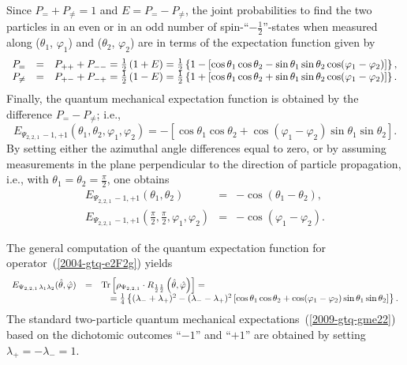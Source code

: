 \documentclass[pra,amsfonts,showpacs,showkeys,preprint]{revtex4}
\begin{document}
Since $P_= + P_{\neq} = 1$ and $E= P_= - P_{\neq}$, the joint probabilities to find the two particles
in an even or in an odd number of
spin-``$-\frac{1}{2}$''-states when measured along
($\theta_1$, $\varphi_1 $) and
($\theta_2$, $\varphi_2 $)
are in terms of the expectation function given by
\begin{equation}
\begin{array}{rcl}
P_= &=& P_{++}+P_{--} =
{1\over2}\left(1 + E  \right)
=\frac{1}{2} \left\{ 1- \left[\cos \theta_1 \cos \theta_2 - \sin \theta_1 \sin \theta_2 \cos (\varphi_1-\varphi_2) \right]\right\}
,
\\
P_{\neq} &=& P_{+-}+P_{-+} =
{1\over2}\left(1 - E \right)
=\frac{1}{2} \left\{ 1+ \left[\cos \theta_1 \cos \theta_2 + \sin \theta_1 \sin \theta_2 \cos (\varphi_1-\varphi_2) \right]\right\}
.
\end{array}
\end{equation}
Finally, the quantum mechanical expectation function is obtained by  the difference $P_= -P_{\neq }$; i.e.,
\begin{equation}
E_{{ \Psi_{2,2,1}}\,-1,+1  }(\theta_1,\theta_2,\varphi_1 , \varphi_2)=
-\left[\cos \theta_1 \cos \theta_2 + \cos (\varphi_1 - \varphi_2) \sin \theta_1 \sin \theta_2\right]
.
\label{2009-gtq-gme22}
\end{equation}
By setting either the azimuthal angle differences equal to zero,
or by assuming measurements in the plane perpendicular to the direction of particle propagation,
i.e., with $\theta_1=\theta_2 =\frac{\pi}{2}$,
one obtains
\begin{equation}
\label{2009-gtq-edosgc}
\begin{array}{rcl}
E_{{ \Psi_{2,2,1}}\,-1,+1  }(\theta_1,\theta_2)&=& -\cos (\theta_1 - \theta_2),\\
E_{{ \Psi_{2,2,1}}\,-1,+1  }(\frac{\pi}{2},\frac{\pi}{2},\varphi_1 , \varphi_2) &=& - \cos (\varphi_1 - \varphi_2).
\end{array}
\end{equation}


The general computation of the quantum expectation function for operator~(\ref{2004-gtq-e2F2g})
yields
\begin{equation}
\begin{array}{rcl}
E_{{ \Psi_{2,2,1}}\,\lambda_1 \lambda_2 } ({\hat \theta},{\hat \varphi} )&=&
{\rm Tr}\left[\rho_{ \Psi_{2,2,1}} \cdot R_{\frac{1}{2}\frac{1}{2} } \left({\hat \theta},{\hat \varphi} \right)\right] =\\
&&\quad  =
\frac{1}{4} \left\{( \lambda_- + \lambda_+ )^2-( \lambda_- - \lambda_+ )^2 \left[\cos
    \theta_1  \cos  \theta_2 +\cos ( \varphi_1 - \varphi_2 ) \sin
    \theta_1  \sin  \theta_2 \right]\right\}.
\end{array}
\end{equation}
The standard two-particle quantum mechanical expectations~(\ref{2009-gtq-gme22}) based on the dichotomic outcomes
``$-1$''
and
``$+1$''
are obtained by setting
$  \lambda_+ = -  \lambda_- =1$.
\end{document}
